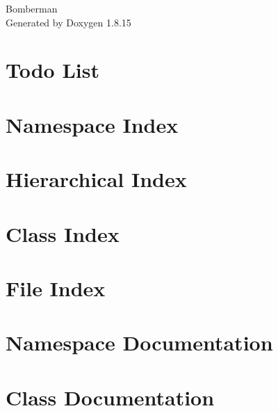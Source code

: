 \let\mypdfximage\pdfximage\def\pdfximage{\immediate\mypdfximage}\documentclass[twoside]{book}
\newcommand{\+}{\discretionary{\mbox{\scriptsize$\hookleftarrow$}}{}{}}
\newcommand{\clearemptydoublepage}{%
  \newpage{\pagestyle{empty}\cleardoublepage}%
}
\begin{document}
\hypersetup{pageanchor=false,
             bookmarksnumbered=true,
             pdfencoding=unicode
            }
\begin{titlepage}
\vspace*{7cm}
\begin{center}%
{\Large Bomberman }\\
\vspace*{1cm}
{\large Generated by Doxygen 1.8.15}\\
\end{center}
\end{titlepage}
\clearemptydoublepage
{}
\tableofcontents
\clearemptydoublepage
{}
\hypersetup{pageanchor=true}

\chapter{Todo List}
\label{todo}

\chapter{Namespace Index}

\chapter{Hierarchical Index}

\chapter{Class Index}

\chapter{File Index}

\chapter{Namespace Documentation}




\chapter{Class Documentation}



























\end{document}

